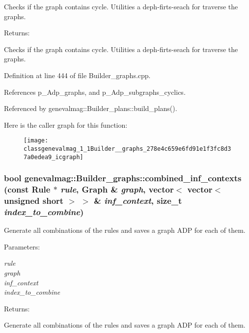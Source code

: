 Checks if the graph contains cycle. Utilities a deph-firts-seach for traverse the graphs. \begin{Desc}
\item[Returns:]\end{Desc}
Checks if the graph contains cycle. Utilities a deph-firts-seach for traverse the graphs. 

Definition at line 444 of file Builder\_\-graphs.cpp.

References p\_\-Adp\_\-graphs, and p\_\-Adp\_\-subgraphs\_\-cyclics.

Referenced by genevalmag::Builder\_\-plans::build\_\-plans().

Here is the caller graph for this function:\nopagebreak
\begin{figure}[H]
\begin{center}
\leavevmode
\texttt{[image: classgenevalmag\_1\_1Builder\_\_graphs\_278e4c659e6fd91e1f3fc8d37a0edea9\_icgraph]}
\end{center}
\end{figure}
\hypertarget{classgenevalmag_1_1Builder__graphs_e8827b596ff808331a1d6e8005e7f71b}{
\subsubsection[{combined\_\-inf\_\-contexts}]{\setlength{\rightskip}{0pt plus 5cm}bool genevalmag::Builder\_\-graphs::combined\_\-inf\_\-contexts (const {\bf Rule} $\ast$ {\em rule}, \/  {\bf Graph} \& {\em graph}, \/  vector$<$ vector$<$ unsigned short $>$ $>$ \& {\em inf\_\-context}, \/  size\_\-t {\em index\_\-to\_\-combine})}}
\label{classgenevalmag_1_1Builder__graphs_e8827b596ff808331a1d6e8005e7f71b}


Generate all combinations of the rules and saves a graph ADP for each of them. \begin{Desc}
\item[Parameters:]
\begin{description}
\item[{\em rule}]\item[{\em graph}]\item[{\em inf\_\-context}]\item[{\em index\_\-to\_\-combine}]\end{description}
\end{Desc}
\begin{Desc}
\item[Returns:]\end{Desc}
Generate all combinations of the rules and saves a graph ADP for each of them. 


